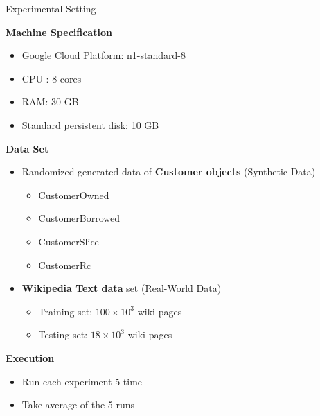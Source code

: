 \documentclass[9pt]{beamer}
\begin{document}
\begin{frame}[t, fragile]{Experimental Setting}
    
    \textbf{Machine Specification}
    \begin{itemize}
        \item Google Cloud Platform: n1-standard-8
        \item CPU : 8 cores
        \item RAM: 30 GB
        \item Standard persistent disk: 10 GB
    \end{itemize}
    \textbf{Data Set}
    \begin{itemize}
        \item Randomized generated data of \textbf{Customer objects} (Synthetic Data)
        \begin{itemize}
            \item CustomerOwned
            \item CustomerBorrowed
            \item CustomerSlice
            \item CustomerRc
        \end{itemize} 
        \item \textbf{Wikipedia Text data} set (Real-World Data)
        \begin{itemize}
            \item Training set: \(100 \times 10^3 \) wiki pages
            \item Testing set: \(18 \times  10^3\) wiki pages
        \end{itemize} 
    \end{itemize} 
    \textbf{Execution}
    \begin{itemize}
        \item Run each experiment 5 time 
        \item Take average of the 5 runs 
    \end{itemize}
\end{frame}

\end{document}
